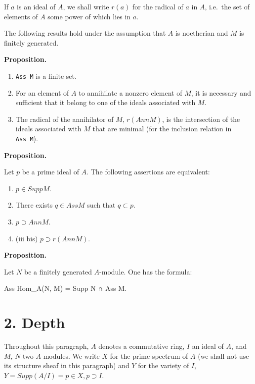 \documentclass[
  11pt,
  a4paper,
]{book}
\newenvironment{Shaded}{}{}
\newcommand{\NormalTok}[1]{#1}
\providecommand{\tightlist}{%
  \setlength{\itemsep}{0pt}\setlength{\parskip}{0pt}}
\begin{document}
If \(a\) is an ideal of \(A\), we shall write \(r(a)\) for the radical
of \(a\) in \(A\), i.e.~the set of elements of \(A\) some power of which
lies in \(a\).

The following results hold under the assumption that \(A\) is noetherian
and \(M\) is finitely generated.

\textbf{Proposition.}

\begin{enumerate}
\def\labelenumi{\arabic{enumi}.}
\item
  \texttt{Ass\ M} is a finite set.
\item
  For an element of \(A\) to annihilate a nonzero element of \(M\), it
  is necessary and sufficient that it belong to one of the ideals
  associated with \(M\).
\item
  The radical of the annihilator of \(M\), \(r(Ann M)\), is the
  intersection of the ideals associated with \(M\) that are minimal (for
  the inclusion relation in \texttt{Ass\ M}).
\end{enumerate}

\textbf{Proposition.}

Let \(p\) be a prime ideal of \(A\). The following assertions are
equivalent:

\begin{enumerate}
\def\labelenumi{\arabic{enumi}.}
\tightlist
\item
  \(p \in Supp M\).
\item
  There exists \(q \in Ass M\) such that \(q \subset p\).
\item
  \(p \supset Ann M\).
\item
  (iii bis) \(p \supset r(Ann M)\).
\end{enumerate}

\textbf{Proposition.}

Let \(N\) be a finitely generated \(A\)-module. One has the formula:

\begin{Shaded}
\begin{Highlighting}[]
\NormalTok{Ass Hom\_A(N, M) = Supp N ∩ Ass M.}
\end{Highlighting}
\end{Shaded}

\section{2. Depth}\label{depth}

Throughout this paragraph, \(A\) denotes a commutative ring, \(I\) an
ideal of \(A\), and \(M\), \(N\) two \(A\)-modules. We write \(X\) for
the prime spectrum of \(A\) (we shall not use its structure sheaf in
this paragraph) and \(Y\) for the variety of \(I\),
\(Y = Supp(A/I) = {p \in X, p \supset I}\).
\end{document}
